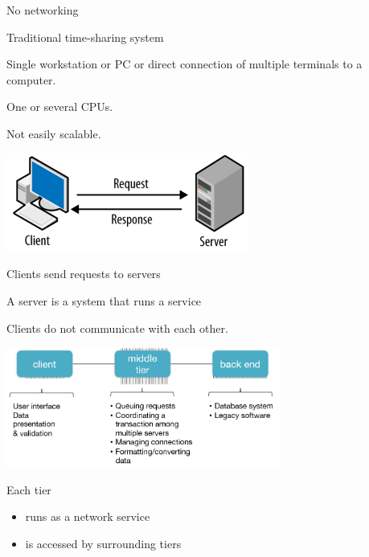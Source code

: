 \begin{slide}

	
	No networking
	\bigskip
	
	Traditional time-sharing system
	\bigskip
	
	Single workstation or PC or direct connection of multiple terminals to a computer.
	\bigskip
	
	One or several CPUs.
	\bigskip
	
	Not easily scalable.

\end{slide}

\begin{slide}


    \includegraphics[width=80mm]{client-server-model.png}
    \bigskip

    Clients send requests to servers
	\bigskip
	
	A server is a system that runs a service
	\bigskip
	
	Clients do not communicate with each other.

\end{slide}

\begin{slide}

	
	\includegraphics[width=90mm]{multi-tier-concept.png}
	
	Each tier
	\begin{itemize}
		\item runs as a network service
		\item is accessed by surrounding tiers
	\end{itemize}

\end{slide}

